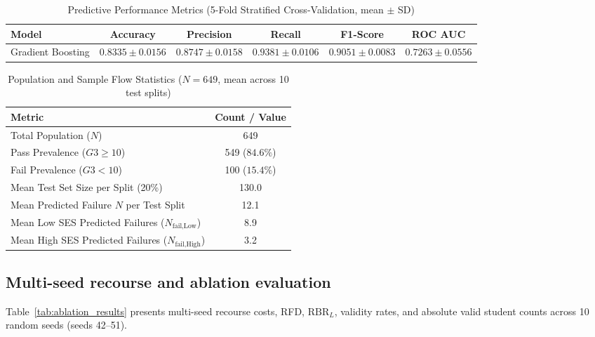 \documentclass[11pt]{article}
\begin{document}
\begin{table}[H]
\centering
\caption{Predictive Performance Metrics (5-Fold Stratified Cross-Validation, mean $\pm$ SD)}
\label{tab:predictive_perf}
\footnotesize
\setlength{\tabcolsep}{3pt}
\begin{tabular}{lccccc}
\toprule
\textbf{Model} & \textbf{Accuracy} & \textbf{Precision} & \textbf{Recall} & \textbf{F1-Score} & \textbf{ROC AUC} \\
\midrule
Gradient Boosting & $0.8335 \pm 0.0156$ & $0.8747 \pm 0.0158$ & $0.9381 \pm 0.0106$ & $0.9051 \pm 0.0083$ & $0.7263 \pm 0.0556$ \\
\bottomrule
\end{tabular}
\end{table}

\begin{table}[H]
\centering
\caption{Population and Sample Flow Statistics ($N=649$, mean across 10 test splits)}
\label{tab:population_flow}
\begin{tabular}{lc}
\toprule
\textbf{Metric} & \textbf{Count / Value} \\
\midrule
Total Population ($N$) & 649 \\
Pass Prevalence ($G3 \ge 10$) & 549 ($84.6\%$) \\
Fail Prevalence ($G3 < 10$) & 100 ($15.4\%$) \\
Mean Test Set Size per Split (20\%) & 130.0 \\
Mean Predicted Failure $N$ per Test Split & 12.1 \\
Mean Low SES Predicted Failures ($N_{\text{fail,Low}}$) & 8.9 \\
Mean High SES Predicted Failures ($N_{\text{fail,High}}$) & 3.2 \\
\bottomrule
\end{tabular}
\end{table}

\subsection{Multi-seed recourse and ablation evaluation}

Table~\ref{tab:ablation_results} presents multi-seed recourse costs, RFD, $\text{RBR}_L$, validity rates, and absolute valid student counts across 10 random seeds (seeds 42--51).
\end{document}
